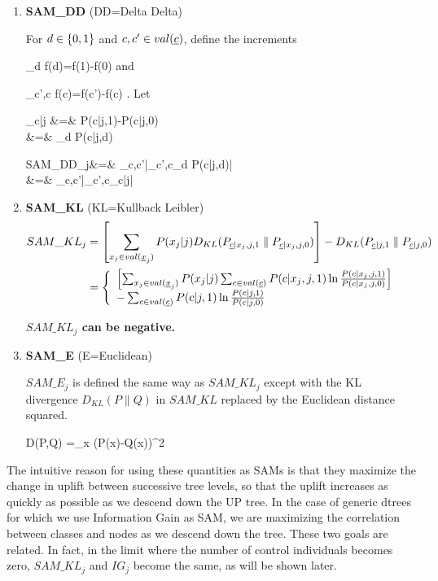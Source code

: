 \begin{enumerate}
\item{\bf SAM\_DD} (DD=Delta Delta)

For $d\in \{0,1\}$
and $c, c'\in val(\rvc)$, define the increments

\beq
\partial_d f(d)=f(1)-f(0)
\eeq
and

\beq
\partial_{c',c} f(c)=f(c')-f(c)
\;.
\eeq
Let

\beqa
\Delta_{c|j} &=& P(c|j,1)-P(c|j,0)
\\
&=& \partial_d P(c|j,d)
\label{eq-delta-c-j}
\eeqa

\beqa
SAM\_DD_j&=& \max_{c,c'}|\partial_{c',c}\partial_d P(c|j,d)|
\\
&=&
\max_{c,c'}|\partial_{c',c}\Delta_{c|j}|
\eeqa

\item{\bf SAM\_KL} (KL=Kullback Leibler)
\begin{align}
SAM\_KL_j&=
\left[
\sum_{x_j\in val(\rvx_j)}
P(x_j|j)
D_{KL}(P_{\rvc|x_j,j,1}\parallel P_{\rvc|x_j,j,0})
\right]
-
D_{KL}(P_{\rvc|j,1}\parallel P_{\rvc|j,0})
\\
&=\left\{\begin{array}{l}
\left[
\sum_{x_j\in val(\rvx_j)}
P(x_j|j)
 \sum_{c\in val(\rvc)}P(c|x_j,j,1)
\ln \frac{P(c|x_j,j,1) }{ P(c|x_j,j,0) }
\right]
\\
-
\sum_{c\in val(\rvc)}
P(c|j,1) 
\ln \frac{P(c|j,1) }{ P(c|j,0) }
\end{array}
\right.
\label{eq-sam-kl}
\end{align}

{\bf $SAM\_KL_j$ can be negative.}

\item {\bf SAM\_E} (E=Euclidean)

$SAM\_E_j$ is defined the same way as $SAM\_KL_j$
except with 
the KL divergence $D_{KL}(P\parallel Q)$ 
in $SAM\_KL$ replaced 
by the Euclidean distance squared. 


\beq
D(P,Q) =\sum_x (P(x)-Q(x))^2
\eeq

\end{enumerate}

The intuitive reason for
 using these quantities as
SAMs is that they maximize the change in uplift 
between 
successive tree levels, so 
that the uplift increases as quickly as possible
as we descend down the UP tree.
In the case of generic dtrees
for which we use Information Gain as SAM, we 
are maximizing the correlation
between classes and nodes as we descend down the tree. 
These two goals are related.
In fact, in the limit
where the
number of control individuals
becomes zero,
$SAM\_KL_j$ and $IG_j$
become the same, as will be shown later.

